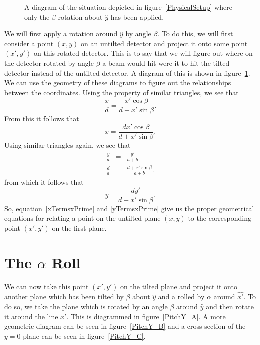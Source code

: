 \begin{figure}
    \centering
    \subfloat[]{\label{PitchX_A}} 
    \hfill
    \subfloat[]{
    \label{PitchX_B}}
    \caption{A diagram of the situation depicted in 
    figure~\ref{PhysicalSetup} where only the 
    $\beta$ rotation about $\hat y$ has been applied.}
    \label{PitchX}
\end{figure}

We will first apply a rotation around $\hat{y}$ by angle $\beta$.
To do this, we will first consider a point $(x,y)$ on an
untilted detector and project it onto some point $(x',y')$ 
on this rotated detector.
This is to say that we will figure out where on the detector
rotated by angle $\beta$ a
beam would hit were it to hit the tilted detector
instead of the untilted detector.
A diagram of this is shown in figure~\ref{PitchX}.  
We can use the geometry of these diagrams to figure out
the relationships between the coordinates. Using
the property of similar triangles, we see that
\begin{equation}
    \frac{x}{d}=\frac{x'\cos\beta}{d+x'\sin\beta}.
\end{equation}
From this it follows that 
\begin{equation}\label{xTermsxPrime}
    \boxed{x = \frac{dx'\cos\beta}{d+x'\sin\beta}.}
\end{equation}
Using similar triangles again, we see that
\begin{eqnarray}
    \frac{y}{a}&=&\frac{y'}{a+b}\\
    \frac{d}{a}&=&\frac{d+x'\sin\beta}{a+b}.
\end{eqnarray}
from which it follows that
\begin{equation}\label{yTermsxPrime}
	\boxed{y= \frac{dy'}{d+x'\sin\beta}.}
\end{equation}
So, equation~\ref{xTermsxPrime} and \ref{yTermsxPrime} give us 
the proper geometrical equations for relating a point on the 
untilted plane $(x,y)$ to the corresponding point 
$(x',y')$ on the first plane.

\section{\texorpdfstring{The $\alpha$ Roll}{The alpha Roll}}

We can now take this point $(x',y')$ on the tilted 
plane and project it onto another plane which has been
tilted by $\beta$ about $\hat y$ and a rolled by
$\alpha$ around $\hat{x'}$. 
To do so, we take the plane which is
rotated by an angle $\beta$ around $\hat{y}$ and then
rotate it around the line $x'$. 
This is diagrammed in figure~\ref{PitchY_A}. 
A more geometric diagram can be seen in 
figure~\ref{PitchY_B} and a cross section of the $y=0$
plane can be seen in figure~\ref{PitchY_C}.

